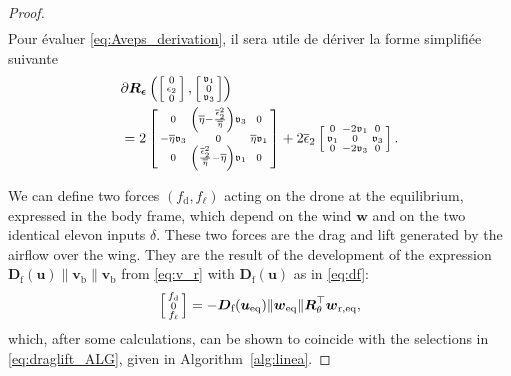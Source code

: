 \begin{proof}
\begin{align}
\end{align}
Pour évaluer \eqref{eq:Aveps_derivation}, il sera utile de dériver la forme simplifiée suivante
\begin{align}
\label{eq:diffRsparse}
    &\partial \boldsymbol{R}_{\boldsymbol{ \epsilon}} \left(
    \left[ \begin{smallmatrix}0 \\ \epsilon_2 \\ 0 \end{smallmatrix} \right]
    ,\left[ \begin{smallmatrix}\mathfrak{v}_1 \\ 0 \\ \mathfrak{v}_3 \end{smallmatrix} \right]\right) \nonumber \\ 
    & = 2  \left[ \begin{smallmatrix}0 & \left( \overline{\eta} - \frac{\overline \epsilon_{2}^{2}}{\overline{\eta}} \right) \mathfrak{v}_3 & 0\\
    -\overline{\eta} \mathfrak{v}_3 & 0 & \overline{\eta} \mathfrak{v}_1 \\
    0 & \left( \frac{\overline \epsilon_{2}^{2}}{\overline{\eta}} - \overline{\eta} \right) \mathfrak{v}_1 & 0 \end{smallmatrix} \right] + 2\overline \epsilon_{2}\left[ \begin{smallmatrix} 0 & -2\mathfrak{v}_1 & 0\\
    \mathfrak{v}_1 & 0 & \mathfrak{v}_3 \\
    0 & -2\mathfrak{v}_3 & 0 \end{smallmatrix} \right].
\end{align}

We can define two forces $(f_{\text{d}} , f_{\ell})$ acting on the drone at the equilibrium, expressed in the body frame, which depend on the wind $\boldsymbol{w}$ and on the two identical elevon inputs $\delta$. These two forces are the drag and lift generated by the airflow over the wing. They are the result of the development of the expression $ \boldsymbol{D}_{\text{f}}(\boldsymbol{u}) \lVert \boldsymbol{v}_{\text{b}} \rVert \boldsymbol{v}_{\text{b}}$ from \eqref{eq:v_r} with $\boldsymbol{D}_{\text{f}}(\boldsymbol{u})$ as in \eqref{eq:df}:
\begin{align}
\label{eq:draglift}
    \left[ \begin{smallmatrix}f_{\text{d}} \\ 0 \\ f_{\ell} \end{smallmatrix} \right] = - \boldsymbol{D}_{\text{f}}(\boldsymbol{u_{\text{eq}}}) \lVert \boldsymbol{w}_{\mathrm{eq}} \rVert  \boldsymbol{R}_\theta^\top \boldsymbol{w}_{\mathrm{r,eq}},
\end{align}
which, after some calculations, can be shown to coincide with the selections in \eqref{eq:draglift_ALG}, given in Algorithm~\ref{alg:linea}.


\end{proof}
